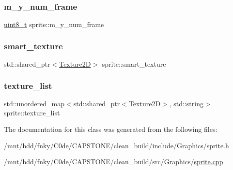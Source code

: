 \mbox{\label{classsprite_a84ce0565b22ff655ff7cc54d6bc5a260}} 
\subsubsection{\texorpdfstring{m\+\_\+y\+\_\+num\+\_\+frame}{m\_y\_num\_frame}}
{\footnotesize\ttfamily \hyperlink{stdint_8h_aba7bc1797add20fe3efdf37ced1182c5}{uint8\+\_\+t} sprite\+::m\+\_\+y\+\_\+num\+\_\+frame\hspace{0.3cm}{\ttfamily [private]}}

\mbox{\label{classsprite_a88c07efe1337b770a4a1f8a1fffe8834}} 
\subsubsection{\texorpdfstring{smart\+\_\+texture}{smart\_texture}}
{\footnotesize\ttfamily std\+::shared\+\_\+ptr$<$\hyperlink{classTexture2D}{Texture2D}$>$ sprite\+::smart\+\_\+texture\hspace{0.3cm}{\ttfamily [private]}}

\mbox{\label{classsprite_aa17ee337e7e0df44f042178b5e522751}} 
\subsubsection{\texorpdfstring{texture\+\_\+list}{texture\_list}}
{\footnotesize\ttfamily std\+::unordered\+\_\+map$<$std\+::shared\+\_\+ptr$<$\hyperlink{classTexture2D}{Texture2D}$>$, \hyperlink{imgui__impl__opengl3__loader_8h_ac83513893df92266f79a515488701770}{std\+::string}$>$ sprite\+::texture\+\_\+list\hspace{0.3cm}{\ttfamily [private]}}



The documentation for this class was generated from the following files\+:\begin{DoxyCompactItemize}
\item 
/mnt/hdd/fnky/\+C0de/\+C\+A\+P\+S\+T\+O\+N\+E/clean\+\_\+build/include/\+Graphics/\hyperlink{sprite_8h}{sprite.\+h}\item 
/mnt/hdd/fnky/\+C0de/\+C\+A\+P\+S\+T\+O\+N\+E/clean\+\_\+build/src/\+Graphics/\hyperlink{sprite_8cpp}{sprite.\+cpp}\end{DoxyCompactItemize}
